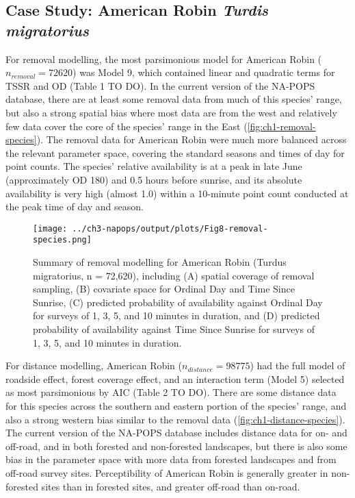\subsection{Case Study: American Robin \textit{Turdis migratorius}}

\par For removal modelling, the most parsimonious model for American Robin ($n_{removal} = 72620$) was Model 9, which contained linear and quadratic terms for TSSR and OD (Table 1 TO DO). In the current version of the NA-POPS database, there are at least some removal data from much of this species’ range, but also a strong spatial bias where most data are from the west and relatively few data cover the core of the species’ range in the East (\autoref{fig:ch1-removal-species}). The removal data for American Robin were much more balanced across the relevant parameter space, covering the standard seasons and times of day for point counts. The species’ relative availability is at a peak in late June (approximately OD 180) and 0.5 hours before sunrise, and its absolute availability is very high (almost 1.0) within a 10-minute point count conducted at the peak time of day and season.

\begin{figure}[h]
	\centering
	\texttt{[image: ../ch3-napops/output/plots/Fig8-removal-species.png]}
	\caption{\label{fig:ch1-removal-species}Summary of removal modelling for American Robin (Turdus migratorius, n = 72,620), including (A) spatial coverage of removal sampling, (B) covariate space for Ordinal Day and Time Since Sunrise, (C) predicted probability of availability against Ordinal Day for surveys of 1, 3, 5, and 10 minutes in duration, and (D) predicted probability of availability against Time Since Sunrise for surveys of 1, 3, 5, and 10 minutes in duration.}
\end{figure}

\par For distance modelling, American Robin ($n_{distance} = 98775$) had the full model of roadside effect, forest coverage effect, and an interaction term (Model 5) selected as most parsimonious by AIC (Table 2 TO DO). There are some distance data for this species across the southern and eastern portion of the species’ range, and also a strong western bias similar to the removal data (\autoref{fig:ch1-distance-species}). The current version of the NA-POPS database includes distance data for on- and off-road, and in both forested and non-forested landscapes, but there is also some bias in the parameter space with more data from forested landscapes and from off-road survey sites. Perceptibility of American Robin is generally greater in non-forested sites than in forested sites, and greater off-road than on-road.  

